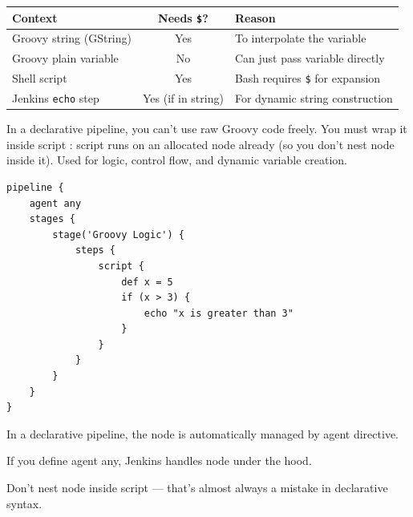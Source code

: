 \documentclass[paper=8.5in:11in, twoside, 12pt, pagesize=pdftex]{book}
\begin{document}
\begin{center}
	\begin{tabular}{|l|c|l|}
		\hline
		\textbf{Context} & \textbf{Needs \texttt{\$}?} & \textbf{Reason} \\
		\hline
		Groovy string (GString) & Yes & To interpolate the variable \\
		\hline
		Groovy plain variable   & No  & Can just pass variable directly \\
		\hline
		Shell script            & Yes & Bash requires \texttt{\$} for expansion \\
		\hline
		Jenkins \texttt{echo} step & Yes (if in string) & For dynamic string construction \\
		\hline
	\end{tabular}
\end{center}


In a declarative pipeline, you can’t use raw Groovy code freely. You must wrap it inside script {}: script {} runs on an allocated node already (so you don’t nest node {} inside it). Used for logic, control flow, and dynamic variable creation.
\begin{lstlisting}
pipeline {
	agent any	
	stages {
		stage('Groovy Logic') {
			steps {
				script {
					def x = 5
					if (x > 3) {
						echo "x is greater than 3"
					}
				}
			}
		}
	}
}
\end{lstlisting}


In a declarative pipeline, the node is automatically managed by agent directive.

If you define agent any, Jenkins handles node {} under the hood.

Don't nest node {} inside script {} — that’s almost always a mistake in declarative syntax.
\end{document}
